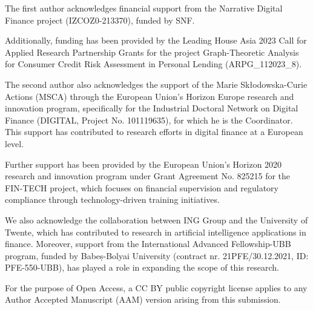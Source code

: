 \documentclass[pdflatex,sn-apa]{sn-jnl}%
\theoremstyle{thmstyleone}%
\theoremstyle{thmstyletwo}%
\theoremstyle{thmstylethree}%
\begin{document}
The first author acknowledges financial support from the Narrative Digital Finance project (IZCOZ0-213370), funded by SNF.

Additionally, funding has been provided by the Leading House Asia 2023 Call for Applied Research Partnership Grants for the project Graph-Theoretic Analysis for Consumer Credit Risk Assessment in Personal Lending (ARPG\_112023\_8).

The second author also acknowledges the support of the Marie Skłodowska-Curie Actions (MSCA) through the European Union’s Horizon Europe research and innovation program, specifically for the Industrial Doctoral Network on Digital Finance (DIGITAL, Project No. 101119635), for which he is the Coordinator. This support has contributed to research efforts in digital finance at a European level.

Further support has been provided by the European Union’s Horizon 2020 research and innovation program under Grant Agreement No. 825215 for the FIN-TECH project, which focuses on financial supervision and regulatory compliance through technology-driven training initiatives.

We also acknowledge the collaboration between ING Group and the University of Twente, which has contributed to research in artificial intelligence applications in finance. Moreover, support from the International Advanced Fellowship-UBB program, funded by Babeș-Bolyai University (contract nr. 21PFE/30.12.2021, ID: PFE-550-UBB), has played a role in expanding the scope of this research.

For the purpose of Open Access, a CC BY public copyright license applies to any Author Accepted Manuscript (AAM) version arising from this submission.

\newpage
\end{document}
